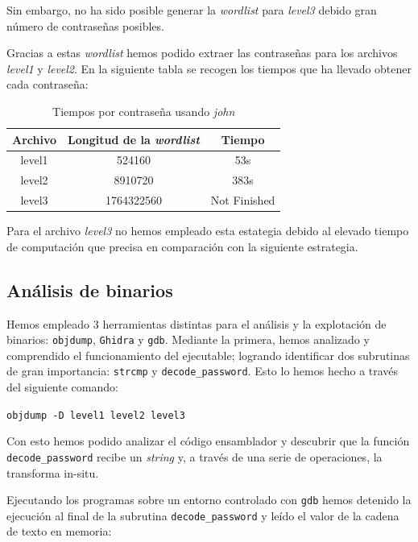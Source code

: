 \documentclass[]{article}
\begin{document}
Sin embargo, no ha sido posible generar la \textit{wordlist} para \textit{level3}  debido gran número de contraseñas posibles.

Gracias a estas \textit{wordlist} hemos podido extraer las contraseñas para los archivos \textit{level1} y \textit{level2}. En la siguiente tabla se recogen los tiempos que ha llevado obtener cada contraseña: 
\begin{table}
\begin{centering}
    \begin{tabular}{|c|c|c|}
        \hline
        Archivo & Longitud de la \textit{wordlist} & Tiempo\\
        \hline
        level1 & 524160 & 53s\\ 
        level2 & 8910720 & 383s\\
        level3 & 1764322560 & Not Finished\\
        \hline
    \end{tabular}
    \caption {\small Tiempos por contraseña usando \textit{john}}
\end{centering}
\end{table}

Para el archivo \textit{level3} no hemos empleado esta estategia debido al elevado tiempo de computación que precisa en comparación con la siguiente estrategia.

\subsection{Análisis de binarios}
\label{subsec:binary}
Hemos empleado 3 herramientas distintas para el análisis y la explotación de binarios: \texttt{objdump}, \texttt{Ghidra} y \texttt{gdb}. Mediante la primera, hemos analizado y comprendido el funcionamiento del ejecutable; logrando identificar dos subrutinas de gran importancia: \texttt{strcmp} y \texttt{decode\_password}. Esto lo hemos hecho a través del siguiente comando:

\begin{center}\texttt{objdump -D level1 level2 level3}\end{center}

Con esto hemos podido analizar el código ensamblador y descubrir que la función \texttt{decode\_password} recibe un \textit{string} y, a través de una serie de operaciones, la transforma in-situ.

Ejecutando los programas sobre un entorno controlado con \texttt{gdb} hemos detenido la ejecución al final de la subrutina \texttt{decode\_password} y leído el valor de la cadena de texto en memoria:
\end{document}
